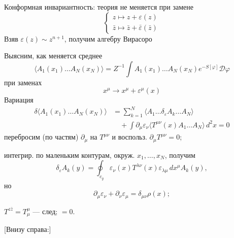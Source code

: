 Конформная инвариантность: теория не меняется при замене
\begin{equation*}
\begin{cases}
z\mapsto z+\varepsilon(z)\\
\bar z\mapsto\bar z+\bar\varepsilon(\bar z)
\end{cases}
\tag{22}
\end{equation*}
Взяв $\varepsilon(z)\sim z^{n+1}$, получим алгебру Вирасоро

Выясним, как меняется среднее
\begin{equation*}
\langle A_1(x_1)\ldots A_N(x_N)\rangle
=Z^{-1}\int A_1(x_1)\ldots A_N(x_N)e^{-S[\varphi]}\mathcal D\varphi
\tag{23}
\end{equation*}
при заменах
\begin{equation*}
x^\mu\to x^\mu+\varepsilon^\mu(x)
\tag{24}
\end{equation*}
Вариация
\begin{equation*}
\begin{aligned}
\delta\langle A_1(x_1)\ldots A_N(x_N)\rangle
&=\sum_{k=1}^{N}\langle A_1\ldots\delta_\varepsilon A_k\ldots A_N\rangle\\
&\quad+\int\partial_\mu\varepsilon_\nu
\langle T^{\mu\nu}(x)A_1\ldots A_N\rangle\,d^2x=0
\end{aligned}
\tag{25}
\end{equation*}
перебросим (по частям) $\partial_\mu$ на $T^{\mu\nu}$ и воспольз. $\partial_\mu T^{\mu\nu}=0$;

интегрир. по маленьким контурам, окруж. $x_1,\ldots,x_N$, получим
\begin{equation*}
\delta_\varepsilon A_k(y)=\oint_{c_y}\varepsilon_\nu(x)T^{\lambda\nu}(x)
\varepsilon_{\lambda\mu}\,dx^\mu A_k(y),
\end{equation*}
но
\begin{equation*}
\partial_\mu\varepsilon_\nu+\partial_\nu\varepsilon_\mu=\delta_{\mu\nu}\rho(x);
\end{equation*}

$T^{z\bar z}=T^\mu_\mu$ — след; $=0$.

[Внизу справа:]
\begin{center}
\end{center}


